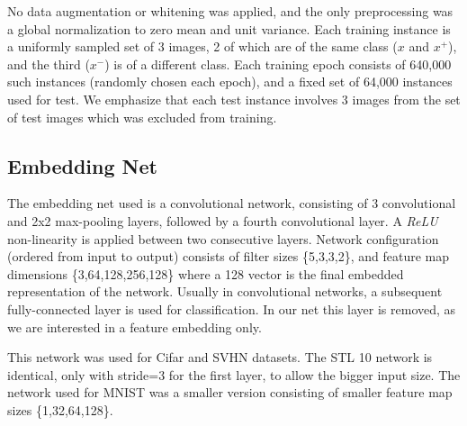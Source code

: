 \documentclass{article} %
\begin{document}
No data augmentation or whitening was applied, and the only preprocessing was a global normalization to zero mean and unit variance.
Each training instance is a uniformly sampled set of 3 images, 2 of which are of the same class ($x$ and $x^{+}$), and the third ($x^{-}$) is of a different class. Each training epoch consists of 640,000 such instances (randomly chosen each epoch), and a fixed set of 64,000 instances used for test. We emphasize that each test instance involves 3 images from the set of test images which was excluded from training.
\subsection{Embedding Net}
The embedding net used is a convolutional network, consisting of 3 convolutional and 2x2 max-pooling layers, followed by a fourth convolutional layer. A \emph{ReLU} non-linearity is applied between two consecutive layers.
Network configuration (ordered from input to output) consists of filter sizes \{5,3,3,2\}, and feature map dimensions \{3,64,128,256,128\} where a 128 vector is the final embedded representation of the network. Usually in convolutional networks, a subsequent fully-connected
layer is used for classification. In our net this layer is removed, as we are interested in a feature embedding only.

This network was used for Cifar and SVHN datasets. The STL 10 network is identical, only with stride=3 for the first layer, to allow the bigger input size. The network used for MNIST was a smaller version consisting of smaller feature map sizes \{1,32,64,128\}.
\end{document}
